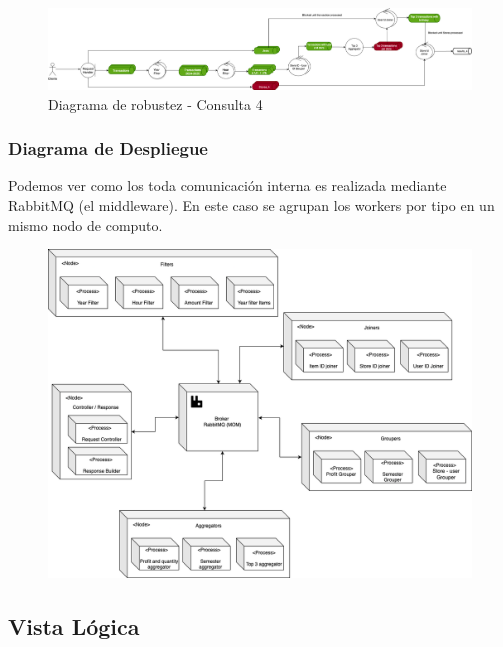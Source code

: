 \documentclass[titlepage,a4paper]{article}
\begin{document}
\begin{figure}[H]
    \centering
    \includegraphics[width=1.0\textwidth]{consulta4.png}
    \caption{Diagrama de robustez - Consulta 4}
\end{figure}

\subsubsection{Diagrama de Despliegue}

Podemos ver como los toda comunicación interna es realizada mediante RabbitMQ (el middleware).
En este caso se agrupan los workers por tipo en un mismo nodo de computo.

\begin{figure}[H]
    \centering
    \includegraphics[width=1\linewidth]{despliegue.png}
\end{figure}


\subsection{Vista Lógica}
\end{document}
